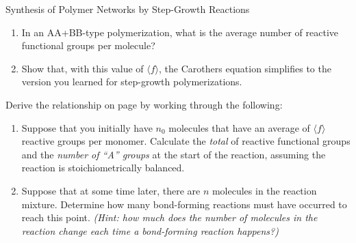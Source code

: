 \begin{activity}[extension]{Synthesis of Polymer Networks by Step-Growth Reactions}
\begin{exercises}
		\begin{enumerate}
			\item In an AA+BB-type polymerization, what is the average number of reactive functional groups per molecule?
			
				\begin{solution}\end{solution}
			
			\item Show that, with this value of $\langle f\rangle$, the Carothers equation simplifies to the version you learned for step-growth polymerizations.
			
				\begin{solution}\end{solution}
		\end{enumerate}	
		
	\exercise \label{\labelbase:exc:Nn} Derive the relationship on page \pageref{\labelbase:eqn:carothers} by working through the following:
	
		\begin{enumerate}
			\item Suppose that you initially have $n_0$ molecules that have an average of $\langle f\rangle$ reactive groups per monomer.  				Calculate the \emph{total} of reactive functional groups and the \emph{number of ``A'' groups} at the start of the reaction, assuming the reaction is stoichiometrically balanced.
			
			\begin{solution}\end{solution}
			
			\item Suppose that at some time later, there are $n$ molecules in the reaction mixture.  Determine how many bond-forming reactions must have occurred to reach this point.  \emph{(Hint: how much does the number of molecules in the reaction change each time a bond-forming reaction happens?)}
			
				\begin{solution}\end{solution}
				

\end{enumerate}
\end{exercises}
\end{activity}
